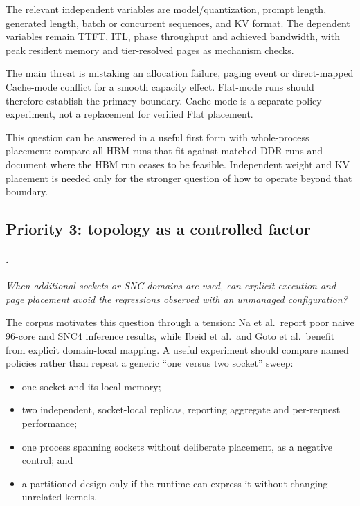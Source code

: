 The relevant independent variables are model/quantization, prompt
length, generated length, batch or concurrent sequences, and KV
format.  The dependent variables remain TTFT, ITL, phase throughput and
achieved bandwidth, with peak resident memory and tier-resolved pages
as mechanism checks.

The main threat is mistaking an allocation failure, paging event or
direct-mapped Cache-mode conflict for a smooth capacity effect.
Flat-mode runs should therefore establish the primary boundary.
Cache mode is a separate policy experiment, not a replacement for
verified Flat placement.

This question can be answered in a useful first form with whole-process
placement: compare all-HBM runs that fit against matched DDR runs and
document where the HBM run ceases to be feasible.  Independent weight
and KV placement is needed only for the stronger question of how to
operate beyond that boundary.

\subsection{Priority 3: topology as a controlled factor}
\label{sec:gap-topology}

\paragraph{.}
\emph{When additional sockets or SNC domains are used, can explicit
execution and page placement avoid the regressions observed with an
unmanaged configuration?}

The corpus motivates this question through a tension: Na et al.\ report
poor naive 96-core and SNC4 inference results, while Ibeid et al.\ and
Goto et al.\ benefit from explicit domain-local mapping.  A useful
experiment should compare named policies rather than repeat a generic
``one versus two socket'' sweep:

\begin{itemize}
  \item one socket and its local memory;
  \item two independent, socket-local replicas, reporting aggregate and
        per-request performance;
  \item one process spanning sockets without deliberate placement, as a
        negative control; and
  \item a partitioned design only if the runtime can express it without
        changing unrelated kernels.
\end{itemize}

